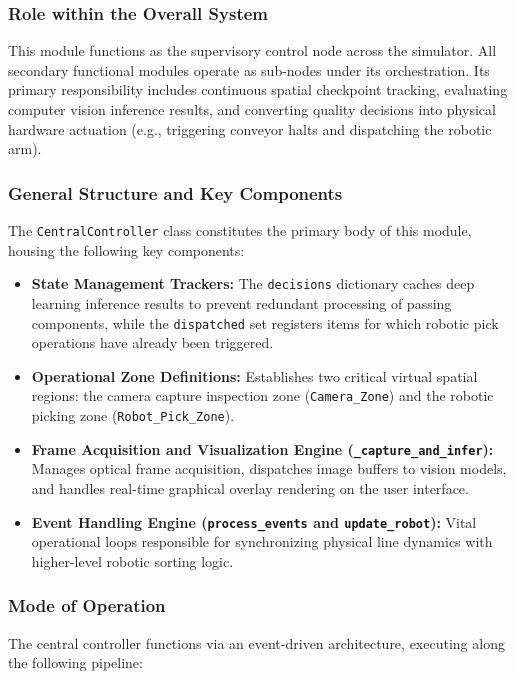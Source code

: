 \documentclass{article}
\begin{document}
\subsubsection{Role within the Overall System}
This module functions as the supervisory control node across the simulator. All secondary functional modules operate as sub-nodes under its orchestration. Its primary responsibility includes continuous spatial checkpoint tracking, evaluating computer vision inference results, and converting quality decisions into physical hardware actuation (e.g., triggering conveyor halts and dispatching the robotic arm).

\subsubsection{General Structure and Key Components}
The \texttt{CentralController} class constitutes the primary body of this module, housing the following key components:

\begin{itemize}
	\item \textbf{State Management Trackers:} The \texttt{decisions} dictionary caches deep learning inference results to prevent redundant processing of passing components, while the \texttt{dispatched} set registers items for which robotic pick operations have already been triggered.
	\item \textbf{Operational Zone Definitions:} Establishes two critical virtual spatial regions: the camera capture inspection zone (\texttt{Camera\_Zone}) and the robotic picking zone (\texttt{Robot\_Pick\_Zone}).
	\item \textbf{Frame Acquisition and Visualization Engine (\texttt{\_capture\_and\_infer}):} Manages optical frame acquisition, dispatches image buffers to vision models, and handles real-time graphical overlay rendering on the user interface.
	\item \textbf{Event Handling Engine (\texttt{process\_events} and \texttt{update\_robot}):} Vital operational loops responsible for synchronizing physical line dynamics with higher-level robotic sorting logic.
\end{itemize}

\subsubsection{Mode of Operation}
The central controller functions via an event-driven architecture, executing along the following pipeline:
\end{document}
